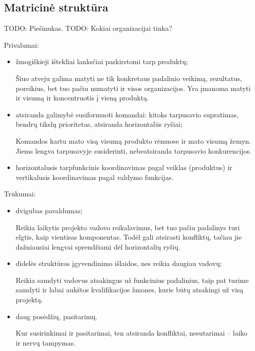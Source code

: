 \subsection{Matricinė struktūra}

TODO: Piešinukas.
TODO: Kokiai organizacijai tinka?

Privalumai:
\begin{itemize}
  \item žmogiškieji ištekliai lanksčiai paskirstomi tarp produktų;
    \begin{note}
      Šiuo atveju galima matyti ne tik konkretaus padalinio veikimą,
      rezultatus, poreikius, bet tuo pačiu numatyti ir visos
      organizacijos. Yra įmanoma matyti ir visumą ir koncentruotis į
      vieną produktą.
    \end{note}
  \item atsiranda galimybė susiformuoti komandai: kitoks tarpusavio 
    supratimas, bendrų tikslų prioritetas, atsiranda horizontalūs
    ryšiai;
    \begin{note}
      Komandos kartu mato visą visumą produkto rėmuose ir mato visumą
      žemyn. Jiems lengva tarpusavyje susiderinti, nebeatsiranda
      tarpusavio konkurencijos.
    \end{note}
  \item horizontalusis tarpfunkcinis koordinavimas pagal veiklas 
    (produktus) ir vertikalusis koordinavimas pagal valdymo funkcijas.
\end{itemize}

Trūkumai:
\begin{itemize}
  \item dvigubas pavaldumas;
    \begin{note}
      Reikia laikytis projekto vadovo reikalavimus, bet tuo pačiu
      padalinys turi elgtis, kaip vientisas komponentas. Todėl gali
      atsirasti konfliktų, tačiau jie dažniausiai lengvai sprendžiami
      dėl horizontalių ryšių.
    \end{note}
  \item didelės struktūros įgyvendinimo išlaidos, nes reikia daugiau
    vadovų;
    \begin{note}
      Reikia samdyti vadovus atsakingus už funkcinius padalinius, taip
      pat turime samdyti ir labai aukštos kvalifikacijos žmones, kurie
      būtų atsakingi už visą projektą.
    \end{note}
  \item daug posėdžių, pasitarimų.
    \begin{note}
      Kur susirinkimai ir pasitarimai, ten atsiranda konfliktai,
      nesutarimai – laiko ir nervų tampymas.
    \end{note}
\end{itemize}

